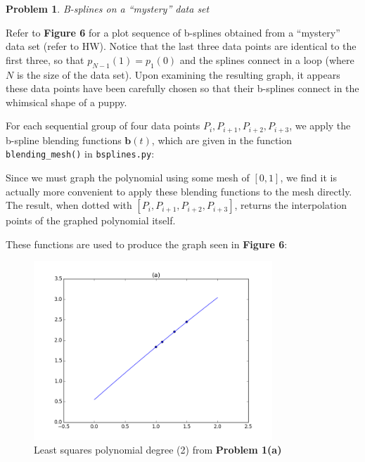 \documentclass[10pt]{article}
\theoremstyle{plain}
\theoremstyle{definition}
\newtheorem{prob}{Problem}
\numberwithin{equation}{section}
\begin{document}
\begin{prob} \textit{B-splines on a ``mystery'' data set}

    Refer to \textbf{Figure 6} for a plot sequence of b-splines obtained from
    a ``mystery'' data set (refer to HW).
    Notice that the last three data points are identical to the first three,
    so that $p_{N-1}(1) = p_1(0)$ and the splines connect in a loop
    (where $N$ is the size of the data set).
    Upon examining the resulting graph, it appears these data points have been
    carefully chosen so that their b-splines connect in the whimsical shape of a
    puppy.

    For each sequential group of four data points $P_{i}, P_{i+1}, P_{i+2}, P_{i+3}$,
    we apply the b-spline blending functions $\bm{b}(t)$,
    which are given in the function \texttt{blending\_mesh()} in \texttt{bsplines.py}:
    
     
    Since we must graph the polynomial using some mesh of $[0,1]$,
    we find it is actually more convenient to apply these blending functions to the mesh directly.
    The result, when dotted with $[P_{i}, P_{i+1}, P_{i+2}, P_{i+3}]$, returns the interpolation points
    of the graphed polynomial itself.

    These functions are used to produce the graph seen in \textbf{Figure 6}:

    

\end{prob}


\begin{figure}[p]
    \begin{center}
        \includegraphics[width=0.8\textwidth]{p1_2}
        \caption{Least squares polynomial degree (2) from \textbf{Problem 1(a)}}
    \end{center}
\end{figure}
\end{document}
